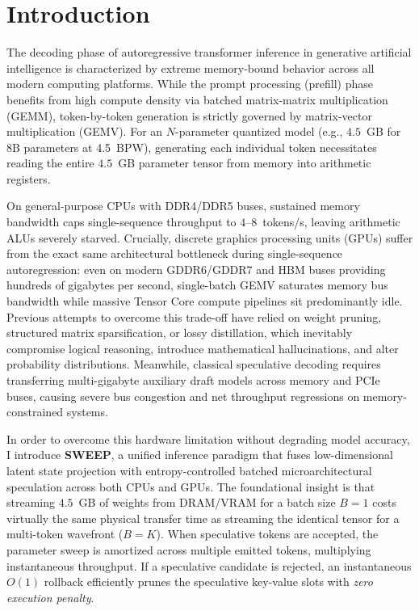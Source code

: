 \documentclass[journal,10pt,twocolumn]{article}
\theoremstyle{definition}
\begin{document}
\section{Introduction}

The decoding phase of autoregressive transformer inference in generative artificial intelligence is characterized by extreme memory-bound behavior across all modern computing platforms. While the prompt processing (prefill) phase benefits from high compute density via batched matrix-matrix multiplication (GEMM), token-by-token generation is strictly governed by matrix-vector multiplication (GEMV). For an $N$-parameter quantized model (e.g., $4.5$~GB for 8B parameters at 4.5~BPW), generating each individual token necessitates reading the entire $4.5$~GB parameter tensor from memory into arithmetic registers.

On general-purpose CPUs with DDR4/DDR5 buses, sustained memory bandwidth caps single-sequence throughput to $4\text{--}8$~tokens/s, leaving arithmetic ALUs severely starved. Crucially, discrete graphics processing units (GPUs) suffer from the exact same architectural bottleneck during single-sequence autoregression: even on modern GDDR6/GDDR7 and HBM buses providing hundreds of gigabytes per second, single-batch GEMV saturates memory bus bandwidth while massive Tensor Core compute pipelines sit predominantly idle. Previous attempts to overcome this trade-off have relied on weight pruning, structured matrix sparsification, or lossy distillation, which inevitably compromise logical reasoning, introduce mathematical hallucinations, and alter probability distributions. Meanwhile, classical speculative decoding requires transferring multi-gigabyte auxiliary draft models across memory and PCIe buses, causing severe bus congestion and net throughput regressions on memory-constrained systems.

In order to overcome this hardware limitation without degrading model accuracy, I introduce \textbf{SWEEP}, a unified inference paradigm that fuses low-dimensional latent state projection with entropy-controlled batched microarchitectural speculation across both CPUs and GPUs. The foundational insight is that streaming $4.5$~GB of weights from DRAM/VRAM for a batch size $B=1$ costs virtually the same physical transfer time as streaming the identical tensor for a multi-token wavefront ($B=K$). When speculative tokens are accepted, the parameter sweep is amortized across multiple emitted tokens, multiplying instantaneous throughput. If a speculative candidate is rejected, an instantaneous $O(1)$ rollback efficiently prunes the speculative key-value slots with \textit{zero execution penalty}.
\end{document}
